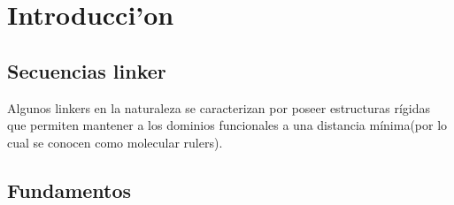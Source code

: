 
\chapter{Introducci'on}
% 



\section{Secuencias linker}

Algunos linkers en la naturaleza se caracterizan por poseer estructuras rígidas que permiten mantener a los dominios funcionales a una distancia mínima(por lo cual se conocen como molecular rulers).



\section{Fundamentos}

